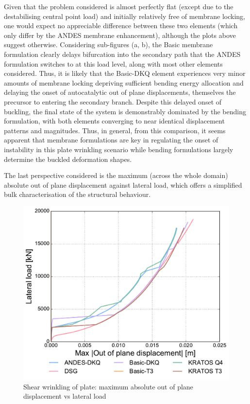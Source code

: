 Given that the problem considered is almost perfectly flat (except due to the destabilising central point load) and initially relatively free of membrane locking, one would expect no appreciable difference between these two elements (which only differ by the ANDES membrane enhancement), although the plots above suggest otherwise. Considering sub-figures (a, b), the Basic membrane formulation clearly delays bifurcation into the secondary path that the ANDES formulation switches to at this load level, along with most other elements considered. Thus, it is likely that the Basic-DKQ element experiences very minor amounts of membrane locking depriving sufficient bending energy allocation and delaying the onset of autocatalytic out of plane displacements, themselves the precursor to entering the secondary branch. Despite this delayed onset of buckling, the final state of the system is demonstrably dominated by the bending formulation, with both elements converging to near identical displacement patterns and magnitudes. Thus, in general, from this comparison, it seems apparent that membrane formulations are key in regulating the onset of instability in this plate wrinkling scenario while bending formulations largely determine the buckled deformation shapes.

The last perspective considered is the maximum (across the whole domain) absolute out of plane displacement against lateral load, which offers a simplified bulk characterisation of the structural behaviour.

\begin{figure}[H]
	\centering
	\def\svgwidth{\columnwidth}
	\includegraphics[width=12cm]{images/stability_wrinkle_abstrans_disp.pdf}
	\caption{Shear wrinkling of plate: maximum absolute out of plane displacement vs lateral load}
	\label{pic:wrinkle3}
\end{figure}

